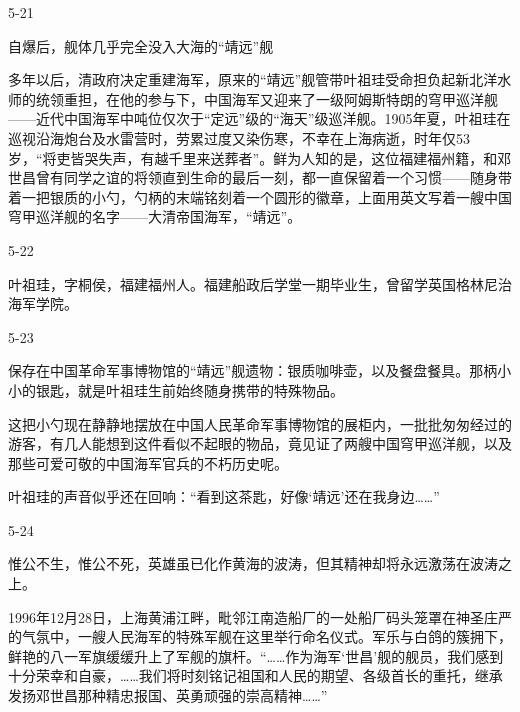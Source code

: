 \documentclass[12pt,UTF8]{ctexbook}
\begin{document}
5-21

自爆后，舰体几乎完全没入大海的“靖远”舰

多年以后，清政府决定重建海军，原来的“靖远”舰管带叶祖珪受命担负起新北洋水师的统领重担，在他的参与下，中国海军又迎来了一级阿姆斯特朗的穹甲巡洋舰——近代中国海军中吨位仅次于“定远”级的“海天”级巡洋舰。1905年夏，叶祖珪在巡视沿海炮台及水雷营时，劳累过度又染伤寒，不幸在上海病逝，时年仅53岁，“将吏皆哭失声，有越千里来送葬者”。鲜为人知的是，这位福建福州籍，和邓世昌曾有同学之谊的将领直到生命的最后一刻，都一直保留着一个习惯——随身带着一把银质的小勺，勺柄的末端铭刻着一个圆形的徽章，上面用英文写着一艘中国穹甲巡洋舰的名字——大清帝国海军，“靖远”。

5-22

叶祖珪，字桐侯，福建福州人。福建船政后学堂一期毕业生，曾留学英国格林尼治海军学院。

5-23

保存在中国革命军事博物馆的“靖远”舰遗物：银质咖啡壶，以及餐盘餐具。那柄小小的银匙，就是叶祖珪生前始终随身携带的特殊物品。

这把小勺现在静静地摆放在中国人民革命军事博物馆的展柜内，一批批匆匆经过的游客，有几人能想到这件看似不起眼的物品，竟见证了两艘中国穹甲巡洋舰，以及那些可爱可敬的中国海军官兵的不朽历史呢。

叶祖珪的声音似乎还在回响：“看到这茶匙，好像‘靖远’还在我身边……”

5-24

惟公不生，惟公不死，英雄虽已化作黄海的波涛，但其精神却将永远激荡在波涛之上。

1996年12月28日，上海黄浦江畔，毗邻江南造船厂的一处船厂码头笼罩在神圣庄严的气氛中，一艘人民海军的特殊军舰在这里举行命名仪式。军乐与白鸽的簇拥下，鲜艳的八一军旗缓缓升上了军舰的旗杆。“……作为海军‘世昌’舰的舰员，我们感到十分荣幸和自豪，……我们将时刻铭记祖国和人民的期望、各级首长的重托，继承发扬邓世昌那种精忠报国、英勇顽强的崇高精神……”



\backmatter
\end{document}
